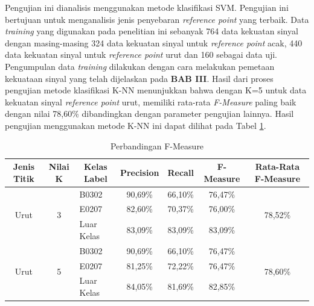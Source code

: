\begin{enumerate}[a.]
\begin{enumerate}
	      \par Pengujian ini dianalisis menggunakan metode klasifikasi SVM. Pengujian ini bertujuan untuk menganalisis jenis penyebaran \textit{reference point} yang terbaik. Data \textit{training} yang digunakan pada penelitian ini sebanyak 764 data kekuatan sinyal dengan masing-masing 324 data kekuatan sinyal untuk \textit{reference point} acak, 440 data kekuatan sinyal untuk \textit{reference point} urut dan 160 sebagai data uji. Pengumpulan data \textit{training} dilakukan dengan cara melakukan pemetaan kekuataan sinyal yang telah dijelaskan pada \textbf{BAB III}. Hasil dari proses pengujian metode klasifikasi K-NN menunjukkan bahwa dengan K=5 untuk data kekuatan sinyal \textit{reference point} urut, memiliki rata-rata \textit{F-Measure} paling baik dengan nilai 78,60\% dibandingkan dengan parameter pengujian lainnya. Hasil pengujian menggunakan metode K-NN ini  dapat dilihat pada Tabel \ref{tabelfmeasure9}.
	      \begin{table}[H]
		      \fontsize{9}{12}\selectfont
		      \center
		      \caption{Perbandingan F-Measure}
		      \label{tabelfmeasure9}
		      \begin{tabular}{|c|c|l|c|c|c|c|}
			      \hline
			      Jenis Titik           & Nilai K            & \multicolumn{1}{c|}{Kelas Label} & Precision & Recall  & F-Measure & Rata-Rata F-Measure      \\ \hline
			      \multirow{3}{*}{Urut} & \multirow{3}{*}{3} & B0302                            & 90,69\%   & 66,10\% & 76,47\%   & \multirow{3}{*}{78,52\%} \\ \cline{3-6}
			                            &                    & E0207                            & 82,60\%   & 70,37\% & 76,00\%   &                          \\ \cline{3-6}
			                            &                    & Luar Kelas                       & 83,09\%   & 83,09\% & 83,09\%   &                          \\ \hline
			      \multirow{3}{*}{Urut} & \multirow{3}{*}{5} & B0302                            & 90,69\%   & 66,10\% & 76,47\%   & \multirow{3}{*}{78,60\%} \\ \cline{3-6}
			                            &                    & E0207                            & 81,25\%   & 72,22\% & 76,47\%   &                          \\ \cline{3-6}
			                            &                    & Luar Kelas                       & 84,05\%   & 81,69\% & 82,85\%   &                          \\ \hline

\end{tabular}
\end{table}
\end{enumerate}
\end{enumerate}
